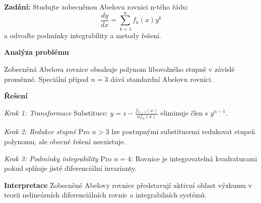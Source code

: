 \begin{example}
\label{ex:zobecnene-abel}

\noindent\textbf{Zadání:} Studujte zobecněnou Abelovu rovnici n-tého řádu:
\[
\frac{dy}{dx} = \sum_{k=1}^n f_k(x) y^k
\]
a odvoďte podmínky integrability a metody řešení.

\vspace{1.5\baselineskip}

\noindent\textbf{Analýza problému}

Zobecněná Abelova rovnice obsahuje polynom libovolného stupně v závislé proměnné. Speciální případ $n=3$ dává standardní Abelovu rovnici.

\vspace{1.5\baselineskip}

\noindent\textbf{Řešení}

\noindent\textit{Krok 1: Transformace}
Substituce: $y = z - \frac{f_{n-1}(x)}{n f_n(x)}$ eliminuje člen s $y^{n-1}$.

\vspace{1\baselineskip}

\noindent\textit{Krok 2: Redukce stupně}
Pro $n > 3$ lze postupnými substitucemi redukovat stupeň polynomu, ale obecné řešení neexistuje.

\vspace{1\baselineskip}

\noindent\textit{Krok 3: Podmínky integrability}
Pro $n=4$: Rovnice je integrovatelná kvadraturami pokud splňuje jisté diferenciální invarianty.

\vspace{1.5\baselineskip}

\noindent\textbf{Interpretace}
Zobecněné Abelovy rovnice představují aktivní oblast výzkumu v teorii nelineárních diferenciálních rovnic a integrabilních systémů.

\end{example}

